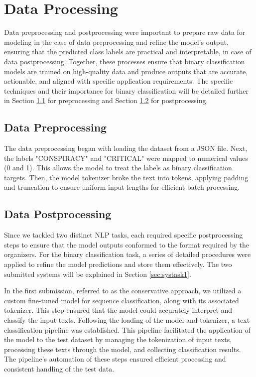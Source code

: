 \documentclass{Configuration_Files/PoliMi3i_thesis}
\begin{document}
\section{Data Processing} \label{sec:data_processing_T1}
Data preprocessing and postprocessing were important to prepare raw data for modeling in the case of data preprocessing and refine the model's output, ensuring that the predicted class labels are practical and interpretable, in case of data postprocessing. Together, these processes ensure that binary classification models are trained on high-quality data and produce outputs that are accurate, actionable, and aligned with specific application requirements. The specific techniques and their importance for binary classification will be detailed further in Section \ref{sec:data_preprocessing_T1} for preprocessing and Section \ref{sec:data_postprocessing_T1} for postprocessing.

\subsection{Data Preprocessing} \label{sec:data_preprocessing_T1}
The data preprocessing began with loading the dataset from a JSON file. Next, the labels "CONSPIRACY" and "CRITICAL" were mapped to numerical values (0 and 1). This allows the model to treat the labels as binary classification targets. Then, the model tokenizer broke the text into tokens, applying padding and truncation to ensure uniform input lengths for efficient batch processing.

\subsection{Data Postprocessing} \label{sec:data_postprocessing_T1}
Since we tackled two distinct NLP tasks, each required specific postprocessing steps to ensure that the model outputs conformed to the format required by the organizers. For the binary classification task, a series of detailed procedures were applied to refine the model predictions and store them effectively. The two submitted systems will be explained in Section \ref{sec:systask1}. 

In the first submission, referred to as the conservative approach, we utilized a custom fine-tuned model for sequence classification, along with its associated tokenizer. This step ensured that the model could accurately interpret and classify the input texts. Following the loading of the model and tokenizer, a text classification pipeline was established. This pipeline facilitated the application of the model to the test dataset by managing the tokenization of input texts, processing these texts through the model, and collecting classification results. The pipeline’s automation of these steps ensured efficient processing and consistent handling of the test data.
\end{document}
